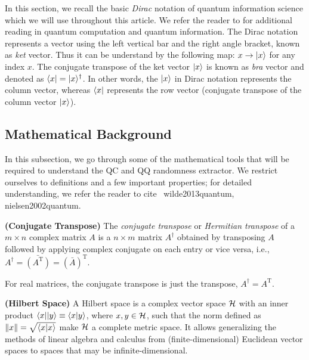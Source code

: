 In this section, we recall the basic \textit{Dirac} notation of quantum information science which we will use throughout this article. We refer the reader to \cite{wilde2013quantum,nielsen2002quantum} for additional reading in quantum computation and quantum information. The Dirac notation represents a vector using the left vertical bar and the right angle bracket, known as \emph{ket} vector. Thus it can be understand by the following map:
$x \rightarrow |x \rangle$ for any index $x$. The conjugate transpose of the ket vector $|x \rangle$ is known as \emph{bra} vector and denoted as $\langle x| = |x \rangle^{\dagger}$. In other words, the $|x \rangle$ in Dirac notation represents the column vector, whereas $\langle x|$ represents the row vector (conjugate transpose of the column vector $|x \rangle$).

\subsection{Mathematical Background}
 In this subsection, we go through some of the mathematical tools that will be required to understand the QC and QQ randomness extractor. We restrict ourselves to definitions and a few important properties; for detailed understanding, we refer the reader to cite \ {wilde2013quantum, nielsen2002quantum}.
 
 \begin{definition}\textbf{(Conjugate Transpose)}
The \emph{conjugate transpose} or \emph{Hermitian transpose} of a $m\times n$ complex matrix $A$ is a $n\times m$ matrix $A^\dagger$ obtained by transposing $A$ followed by applying complex conjugate on each entry or vice versa, i.e., $A^\dagger = \bar{(A^\text{T})} = (\bar{A})^{\text{T}}$. 

For real matrices, the conjugate transpose is just the transpose, $A^{\dagger} =A^{\text{T}}$.
\end{definition}
 
\begin{definition}\textbf{(Hilbert Space)} A Hilbert space is a complex vector space $\mathcal{H}$ with an inner product   $ \langle x||y \rangle \equiv \langle  x | y \rangle $, where $x,y \in \mathcal{H}$, such that the norm defined as $\lVert x\rVert = \sqrt{\langle  x |x \rangle}$ make $\mathcal{H}$ a complete metric space. It allows generalizing the methods of linear algebra and calculus from (finite-dimensional) Euclidean vector spaces to spaces that may be infinite-dimensional.
\end{definition}

